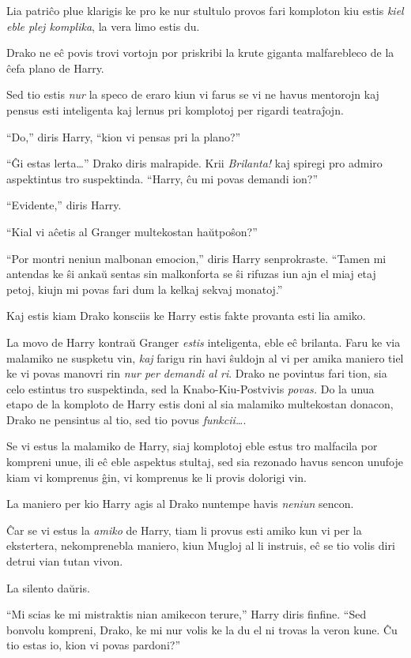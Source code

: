 Lia patriĉo plue klarigis ke pro ke nur stultulo provos fari komploton
kiu estis \emph{kiel eble plej komplika}, la vera limo estis du.

Drako ne eĉ povis trovi vortojn por priskribi la krute giganta
malfarebleco de la ĉefa plano de Harry.

Sed tio estis \emph{nur} la speco de eraro kiun vi farus se vi ne
havus mentorojn kaj pensus esti inteligenta kaj lernus pri komplotoj
per rigardi teatraĵojn.

``Do,'' diris Harry, ``kion vi pensas pri la plano?''

``Ĝi estas lerta\ldots{}'' Drako diris malrapide. Krii
\emph{Brilanta!} kaj spiregi pro admiro aspektintus tro
suspektinda. ``Harry, ĉu mi povas demandi ion?''

``Evidente,'' diris Harry.

``Kial vi aĉetis al Granger multekostan haŭtpoŝon?''

``Por montri neniun malbonan emocion,'' diris Harry
senprokraste. ``Tamen mi antendas ke ŝi ankaŭ sentas sin malkonforta
se ŝi rifuzas iun ajn el miaj etaj petoj, kiujn mi povas fari dum la
kelkaj sekvaj monatoj.''

Kaj estis kiam Drako konsciis ke Harry estis fakte provanta esti lia amiko.

La movo de Harry kontraŭ Granger \emph{estis} inteligenta, eble eĉ
brilanta. Faru ke via malamiko ne suspketu vin, \emph{kaj} farigu rin
havi ŝuldojn al vi per amika maniero tiel ke vi povas manovri rin
\emph{nur per demandi al ri}. Drako ne povintus fari tion, sia celo
estintus tro suspektinda, sed la Knabo-Kiu-Postvivis \emph{povas.} Do
la unua etapo de la komploto de Harry estis doni al sia malamiko
multekostan donacon, Drako ne pensintus al tio, sed tio povus
\emph{funkcii\ldots{}}.

Se vi estus la malamiko de Harry, siaj komplotoj eble estus tro
malfacila por kompreni unue, ili eĉ eble aspektus stultaj, sed sia
rezonado havus sencon unufoje kiam vi komprenus ĝin, vi komprenus ke
li provis dolorigi vin.

La maniero per kio Harry agis al Drako nuntempe havis \emph{neniun} sencon.

Ĉar se vi estus la \emph{amiko} de Harry, tiam li provus esti amiko
kun vi per la ekstertera, nekomprenebla maniero, kiun Mugloj al li
instruis, eĉ se tio volis diri detrui vian tutan vivon.

La silento daŭris.

``Mi scias ke mi mistraktis nian amikecon terure,'' Harry diris
finfine. ``Sed bonvolu kompreni, Drako, ke mi nur volis ke la du el ni
trovas la veron kune. Ĉu tio estas io, kion vi povas pardoni?''


